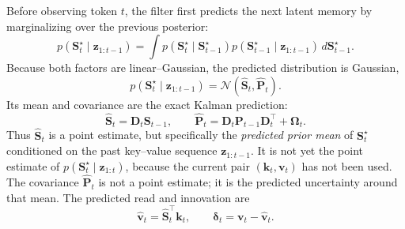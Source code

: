 \documentclass[11pt]{article}
\newcommand{\ve}[1]{\boldsymbol{#1}}
\newcommand{\tr}{\intercal}
\begin{document}
Before observing token $t$, the filter first predicts the next latent memory by marginalizing
over the previous posterior:
\begin{equation}
  p(\ve{S}_t^\star\mid \ve{z}_{1:t-1})
  =
  \int
  p(\ve{S}_t^\star\mid \ve{S}_{t-1}^\star)
  p(\ve{S}_{t-1}^\star\mid \ve{z}_{1:t-1})
  \,d\ve{S}_{t-1}^\star .
  \label{eq:prediction-integral}
\end{equation}
Because both factors are linear--Gaussian, the predicted distribution is Gaussian,
\begin{equation}
  p(\ve{S}_t^\star\mid \ve{z}_{1:t-1})
  =
  \mathcal{N}(\widehat{\ve{S}}_t,\widehat{\ve{P}}_t).
  \label{eq:predicted-prior}
\end{equation}
Its mean and covariance are the exact Kalman prediction:
\begin{equation}
  \widehat{\ve{S}}_t=\ve{D}_t\ve{S}_{t-1},
  \qquad
  \widehat{\ve{P}}_t
  =
  \ve{D}_t\ve{P}_{t-1}\ve{D}_t^{\tr}+\ve{\Omega}_t.
  \label{eq:kam-predict}
\end{equation}
Thus $\widehat{\ve{S}}_t$ is a point estimate, but specifically the \emph{predicted prior
mean} of $\ve{S}_t^\star$ conditioned on the past key--value sequence
$\ve{z}_{1:t-1}$. It is not yet the point estimate of
$p(\ve{S}_t^\star\mid \ve{z}_{1:t})$, because the current pair
$(\ve{k}_t,\ve{v}_t)$ has not been used. The covariance $\widehat{\ve{P}}_t$ is not a point
estimate; it is the predicted uncertainty around that mean.
The predicted read and innovation are
\begin{equation}
  \widehat{\ve{v}}_t=\widehat{\ve{S}}_t^{\tr}\ve{k}_t,
  \qquad
  \ve{\delta}_t=\ve{v}_t-\widehat{\ve{v}}_t.
  \label{eq:kam-innovation}
\end{equation}
\end{document}
